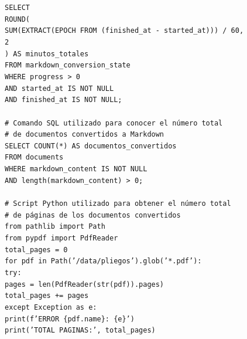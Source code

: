 \begin{tcolorbox}[
	colback=black!3,
	colframe=black!30,
	boxrule=0.5pt,
	arc=2mm,
	title=Terminal,
	fonttitle=\bfseries,
	breakable
]
{\footnotesize
\noindent
\texttt{SELECT}\\
	\hspace*{1em}\texttt{ROUND(}\\
		\hspace*{2em}\texttt{SUM(EXTRACT(EPOCH FROM (finished\_at - started\_at))) / 60,}\\
		\hspace*{2em}\texttt{2}\\
	\hspace*{1em}\texttt{) AS minutos\_totales}\\
\texttt{FROM markdown\_conversion\_state}\\
\texttt{WHERE progress > 0}\\
	\hspace*{1em}\texttt{AND started\_at IS NOT NULL}\\
	\hspace*{1em}\texttt{AND finished\_at IS NOT NULL;}\\
	\\
\texttt{\# Comando SQL utilizado para conocer el número total}\\
\texttt{\# de documentos convertidos a Markdown}\\
\texttt{SELECT COUNT(*) AS documentos\_convertidos}\\
\texttt{FROM documents}\\
\texttt{WHERE markdown\_content IS NOT NULL}\\
	\hspace*{1em}\texttt{AND length(markdown\_content) > 0;}\\
	\\
\texttt{\# Script Python utilizado para obtener el número total}\\
\texttt{\# de páginas de los documentos convertidos}\\
\texttt{from pathlib import Path}\\
\texttt{from pypdf import PdfReader}\\
\texttt{total\_pages = 0}\\
\texttt{for pdf in Path('/data/pliegos').glob('*.pdf'):}\\
	\hspace*{1em}\texttt{try:}\\
		\hspace*{2em}\texttt{pages = len(PdfReader(str(pdf)).pages)}\\
		\hspace*{2em}\texttt{total\_pages += pages}\\
	\hspace*{1em}\texttt{except Exception as e:}\\
		\hspace*{2em}\texttt{print(f'ERROR \{pdf.name\}: \{e\}') }\\
\texttt{print('TOTAL PAGINAS:', total\_pages)}
}
\end{tcolorbox}
\label{fig:comando_conversion}
\vspace{0.5cm}	

